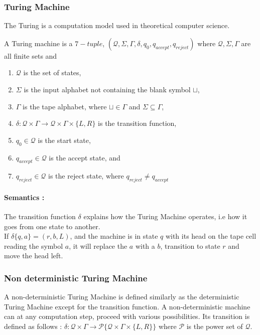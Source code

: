 \subsubsection{Turing Machine}
The Turing is a computation model used in theoretical computer science.

\begin{defn}
A Turing machine is a $7-tuple$, $(\mathcal{Q}, \Sigma, \Gamma, \delta,q_0, q_{accept}, q_{reject})$ where $\mathcal{Q}, \Sigma, \Gamma$ are all finite sets and
\begin{enumerate}
    \item $\mathcal{Q}$ is the set of states,
    \item $\Sigma$ is the input alphabet not containing the blank symbol  $\sqcup$,
    \item $\Gamma$ is the tape alphabet, where $\sqcup \in \Gamma$ and $\Sigma \subseteq \Gamma$,
    \item $\delta : \mathcal{Q} \times \Gamma \rightarrow  \mathcal{Q} \times \Gamma \times \{L, R\}$ is the transition function,
    \item $q_0 \in \mathcal{Q}$ is the start state,
    \item $q_{accept} \in \mathcal{Q}$ is the accept state, and
    \item $q_{reject} \in \mathcal{Q}$ is the reject state, where $q_{reject} \neq q_{accept}$
\end{enumerate}

\paragraph{Semantics :} The transition function $\delta$ explains how the Turing Machine operates, i.e how it goes from one state to another. \\
If $\delta\{q,a\} = (r,b,L)$, and the machine is in state $q$ with its head on the tape cell reading the symbol $a$, it will replace the $a$ with a $b$, transition to state $r$ and move the head left.
\end{defn}

\subsubsection{Non deterministic Turing Machine}
A non-deterministic Turing Machine is defined similarly as the deterministic Turing Machine except for the transition function. A non-deterministic machine can at any computation step, proceed with various possibilities. Its transition is defined as follows :
$\delta : \mathcal{Q} \times \Gamma \rightarrow  \mathcal{P}\{\mathcal{Q} \times \Gamma \times \{L, R\}\}$ where $\mathcal{P}$ is the power set of $\mathcal{Q}$.   

